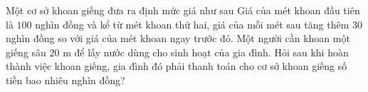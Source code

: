 \begin{ex}%
	Một cơ sở khoan giếng đưa ra định mức giá như sau Giá của mét khoan đầu tiên là $100$ nghìn đồng và kể từ mét khoan thứ hai, giá của mỗi mét sau tăng thêm $30$ nghìn đồng so với giá của mét  khoan ngay trước đó. Một người cần khoan một giếng sâu $20$ m để lấy nước dùng cho sinh hoạt của gia đình. Hỏi sau khi hoàn thành việc khoan giếng, gia đình đó phải thanh toán cho cơ sở khoan giếng số tiền bao nhiêu nghìn đồng?
\end{ex}

